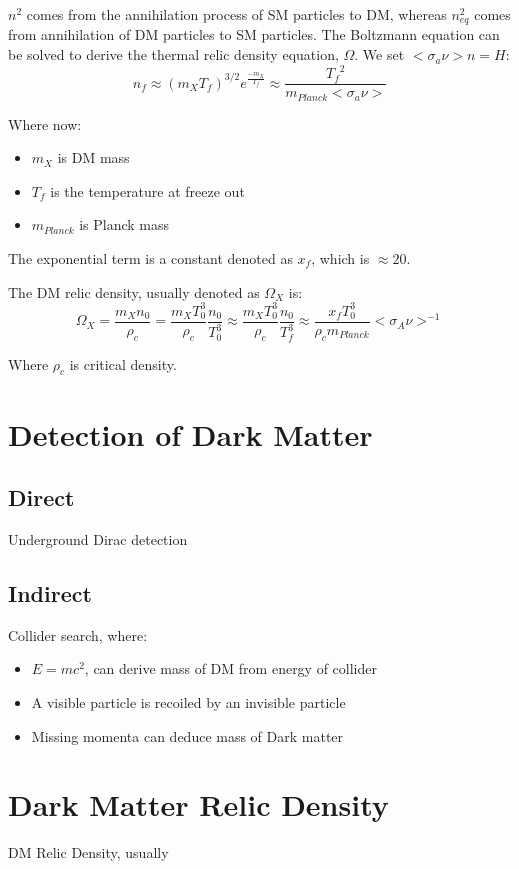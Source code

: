 \documentclass[11pt,a4paper]{article}
\begin{document}
$n^2$ comes from the annihilation process of SM particles to DM, whereas $n_{eq}^2$ comes from annihilation of DM particles to SM particles. The Boltzmann equation can be solved to derive the thermal relic density equation, $\Omega$. We set $<\sigma_a \nu>n = H$:
\begin{equation}
    n_f \approx (m_X T_f)^{3/2}e^{\frac{-m_X}{T_f}} \approx \frac{{T_f}^2}{m_{Planck}<\sigma_a \nu>}
\end{equation}

Where now:
\begin{itemize}
    \item $m_X$ is DM mass
    \item $T_f$ is the temperature at freeze out
    \item $m_{Planck}$ is Planck mass
\end{itemize}

The exponential term is a constant denoted as $x_f$, which is $\approx20$.

The DM relic density, usually denoted as $\Omega_X$ is:
\begin{equation}
    \Omega_X = \frac{m_X n_0}{\rho_c} = \frac{m_X T_0^3}{\rho_c}\frac{n_0}{T_0^3} \approx \frac{m_X T_0^3}{\rho_c}\frac{n_0}{T_f^3} \approx \frac{x_f T_0^3}{\rho_c m_{Planck}}<\sigma_A\nu>^{-1}
\end{equation}

Where $\rho_c$ is critical density.

\section{Detection of Dark Matter}
\subsection{Direct}
Underground Dirac detection
\subsection{Indirect}
Collider search, where:
\begin{itemize}
    \item $E = mc^2$, can derive mass of DM from energy of collider
    \item A visible particle is recoiled by an invisible particle
    \item Missing momenta can deduce mass of Dark matter
\end{itemize}

\section{Dark Matter Relic Density}
DM Relic Density, usually 
\end{document}
